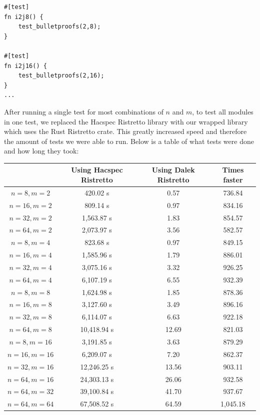 \documentclass{article}
\begin{document}
\begin{lstlisting}
#[test]
fn i2j8() {
    test_bulletproofs(2,8);
}

#[test]
fn i2j16() {
    test_bulletproofs(2,16);
}
...
\end{lstlisting}

After running a single test for most combinations of $n$ and $m$, to
test all modules in one test, we replaced the Hacspec Ristretto library
with our wrapped library which uses the Rust Ristretto crate. This greatly increased speed and therefore
the amount of tests we were able to run. Below is a table of what tests 
were done and how long they took:

\begin{center}
\begin{tabular}{ c|c|c|c } 
	& Using Hacspec Ristretto & Using Dalek Ristretto & Times faster\\ \hline\hline
	$n = 8, m = 2$    & 420.02 s     & 0.57  & 736.84 \\ \hline 
	$n = 16, m = 2$   & 809.14 s     & 0.97  & 834.16 \\ \hline 
	$n = 32, m = 2$   & 1,563.87 s   & 1.83  & 854.57 \\ \hline 
	$n = 64, m = 2$   & 2,073.97 s   & 3.56  & 582.57 \\ \hline 
	\hline\hline
	$n = 8, m = 4$    & 823.68 s     & 0.97  & 849.15 \\ \hline 
	$n = 16, m = 4$   & 1,585.96 s   & 1.79  & 886.01 \\ \hline 
	$n = 32, m = 4$   & 3,075.16 s   & 3.32  & 926.25 \\ \hline 
	$n = 64, m = 4$   & 6,107.19 s   & 6.55  & 932.39 \\ \hline 
	\hline\hline
	$n = 8, m = 8$    & 1,624.98 s   & 1.85  & 878.36 \\ \hline 
	$n = 16, m = 8$   & 3,127.60 s   & 3.49  & 896.16 \\ \hline 
	$n = 32, m = 8$   & 6,114.07 s   & 6.63  & 922.18 \\ \hline 
	$n = 64, m = 8$   & 10,418.94 s  & 12.69 & 821.03 \\ \hline 
	\hline\hline
	$n = 8, m = 16$   & 3,191.85 s   & 3.63  & 879.29 \\ \hline 
	$n = 16, m = 16$  & 6,209.07 s   & 7.20  & 862.37 \\ \hline 
	$n = 32, m = 16$  & 12,246.25 s  & 13.56 & 903.11 \\ \hline 
	$n = 64, m = 16$  & 24,303.13 s  & 26.06 & 932.58 \\ \hline 
	\hline\hline
	$n = 64, m = 32$  & 39,100.84 s  & 41.70 & 937.67 \\ \hline 
	\hline\hline
	$n = 64, m = 64$  & 67,508.52 s  & 64.59 & 1,045.18 \\ \hline 
\end{tabular}
\end{center}
\end{document}

